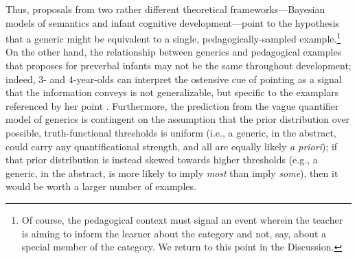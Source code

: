 \documentclass[10pt,letterpaper]{article}
\begin{document}
Thus, proposals from two rather different theoretical frameworks---Bayesian models of semantics and infant cognitive development---point to the hypothesis that a generic might be equivalent to a single, pedagogically-sampled example.\footnote{Of course, the pedagogical context must signal an event wherein the teacher is aiming to inform the learner about the category and not, say, about a special member of the category. We return to this point in the Discussion.}
On the other hand, the relationship between generics and pedagogical examples that  proposes for preverbal infants may not be the same throughout development; indeed, 3- and 4-year-olds can interpret the ostensive cue of pointing as a signal that the information conveys is not generalizable, but specific to the examplars referenced by her point \cite{meyer2013}.
Furthermore, the prediction from the vague quantifier model of generics is contingent on the assumption that the prior distribution over possible, truth-functional thresholds is uniform (i.e., a generic, in the abstract, could carry any quantificational strength, and all are equally likely \emph{a priori}); if that prior distribution is instead skewed towards higher thresholds (e.g., a generic, in the abstract, is more likely to imply \emph{most} than imply \emph{some}), then it would be worth a larger number of examples. 



\end{document}
